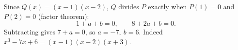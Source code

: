 Since $Q(x)=(x-1)(x-2)$, $Q$ divides $P$ exactly when $P(1)=0$ and $P(2)=0$ (factor theorem):
\[
1+a+b=0,\qquad 8+2a+b=0 .
\]
Subtracting gives $7+a=0$, so $\boxed{a=-7,\ b=6}$. Indeed $x^3-7x+6=(x-1)(x-2)(x+3)$.
